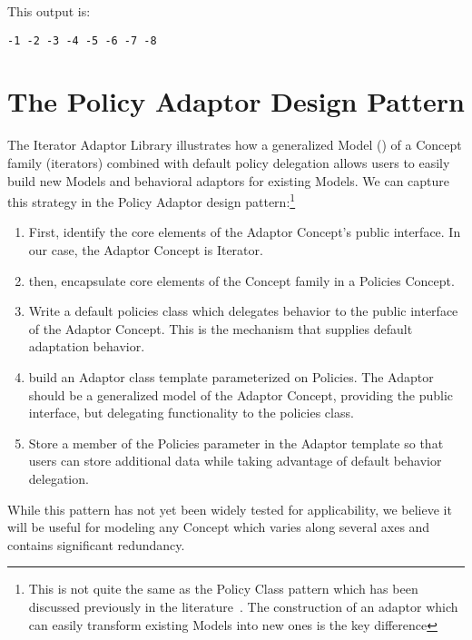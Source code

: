 \documentclass{netobjectdays}
\newcommand{\iteratoradaptor}{\code{iterator\_\-adaptor}}
\begin{document}
\noindent This output is: 
{\footnotesize
\begin{verbatim}
-1 -2 -3 -4 -5 -6 -7 -8
\end{verbatim}
}

\section{The Policy Adaptor Design Pattern}

The Iterator Adaptor Library illustrates how a generalized Model
(\iteratoradaptor{}) of a Concept family (iterators) combined with
default policy delegation allows users to easily build new Models and
behavioral adaptors for existing Models. We can capture this strategy
in the Policy Adaptor design pattern:\footnote{This is not quite the
same as the Policy Class pattern which has been discussed previously
in the literature~\cite{alexandrescu01:_modern_cpp_design}. The
construction of an adaptor which can easily transform existing Models
into new ones is the key difference}\begin{enumerate}

 \item First, identify the core elements of the Adaptor Concept's
 public interface. In our case, the Adaptor Concept is Iterator.

 \item then, encapsulate core elements of the Concept family in a
Policies Concept.

 \item Write a default policies class which delegates behavior to the
public interface of the Adaptor Concept. This is the mechanism that
supplies default adaptation behavior.

 \item build an Adaptor class template parameterized on Policies. The
Adaptor should be a generalized model of the Adaptor Concept,
providing the public interface, but delegating functionality to the
policies class.

 \item Store a member of the Policies parameter in the Adaptor
template so that users can store additional data while taking
advantage of default behavior delegation.

\end{enumerate}

While this pattern has not yet been widely tested for applicability,
we believe it will be useful for modeling any Concept which varies
along several axes and contains significant redundancy.
\end{document}
